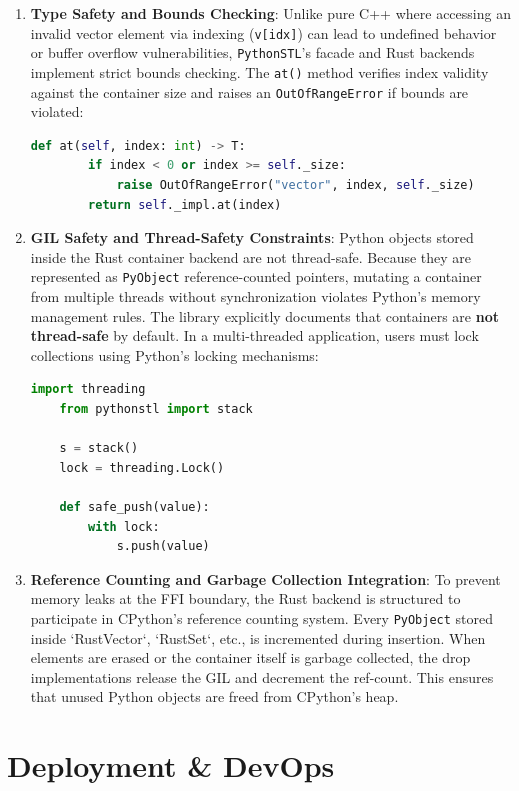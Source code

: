 \documentclass[11pt,a4paper]{article}
\begin{document}
\begin{enumerate}
    \item \textbf{Type Safety and Bounds Checking}:
    Unlike pure C++ where accessing an invalid vector element via indexing (\texttt{v[idx]}) can lead to undefined behavior or buffer overflow vulnerabilities, \texttt{PythonSTL}'s facade and Rust backends implement strict bounds checking. The \texttt{at()} method verifies index validity against the container size and raises an \texttt{OutOfRangeError} if bounds are violated:
    \begin{lstlisting}[language=Python]
    def at(self, index: int) -> T:
        if index < 0 or index >= self._size:
            raise OutOfRangeError("vector", index, self._size)
        return self._impl.at(index)
    \end{lstlisting}

    \item \textbf{GIL Safety and Thread-Safety Constraints}:
    Python objects stored inside the Rust container backend are not thread-safe. Because they are represented as \texttt{PyObject} reference-counted pointers, mutating a container from multiple threads without synchronization violates Python's memory management rules. The library explicitly documents that containers are \textbf{not thread-safe} by default. In a multi-threaded application, users must lock collections using Python's locking mechanisms:
    \begin{lstlisting}[language=Python]
    import threading
    from pythonstl import stack

    s = stack()
    lock = threading.Lock()

    def safe_push(value):
        with lock:
            s.push(value)
    \end{lstlisting}

    \item \textbf{Reference Counting and Garbage Collection Integration}:
    To prevent memory leaks at the FFI boundary, the Rust backend is structured to participate in CPython's reference counting system. Every \texttt{PyObject} stored inside `RustVector`, `RustSet`, etc., is incremented during insertion. When elements are erased or the container itself is garbage collected, the drop implementations release the GIL and decrement the ref-count. This ensures that unused Python objects are freed from CPython's heap.
\end{enumerate}

\newpage

\section{Deployment \& DevOps}
\end{document}
